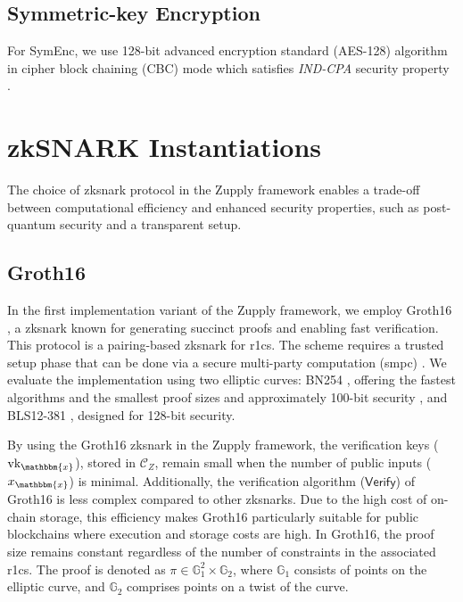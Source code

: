\subsection{Symmetric-key Encryption}
For \textsf{SymEnc}, we use 128-bit advanced encryption standard (AES-128) algorithm in cipher block chaining (CBC) mode which satisfies \textit{IND-CPA} security property \cite{rogaway2011evaluation, sibleyras2020Security}.

\section{zkSNARK Instantiations}
The choice of \gls{zksnark} protocol in the Zupply framework enables a trade-off between computational efficiency and enhanced security properties, such as post-quantum security and a transparent setup.

\subsection{Groth16}

In the first implementation variant of the Zupply framework, we employ Groth16 \cite{Groth2016}, a \gls{zksnark} known for generating succinct proofs and enabling fast verification. This protocol is a pairing-based \gls{zksnark} for \gls{r1cs}. The scheme requires a trusted setup phase that can be done via a secure multi-party computation (\gls{smpc}) \cite{Ben-Sasson2015SecureSampling, Nikolaenko2024PowersofTau}.
We evaluate the implementation using two elliptic curves: BN254 \cite{BNcurve}, offering the fastest algorithms and the smallest proof sizes and approximately 100-bit security \cite{Barbulescu2019}, and BLS12-381 \cite{BLS_curve2003}, designed for 128-bit security.


By using the Groth16 \gls{zksnark} in the Zupply framework, the verification keys ($\text{vk}_\mathbbm{x}$), stored in $\mathcal{C}_Z$, remain small when the number of public inputs ($x_\mathbbm{x}$) is minimal. Additionally, the verification algorithm ($\mathsf{Verify}$) of Groth16 is less complex compared to other \gls{zksnark}s. Due to the high cost of on-chain storage, this efficiency makes Groth16 particularly suitable for public blockchains where execution and storage costs are high.
In Groth16, the proof size remains constant regardless of the number of constraints in the associated \gls{r1cs}. The proof is denoted as \(\pi \in \mathbb{G}_1^2 \times \mathbb{G}_2\), where \(\mathbb{G}_1\) consists of points on the elliptic curve, and \(\mathbb{G}_2\) comprises points on a twist of the curve.  

